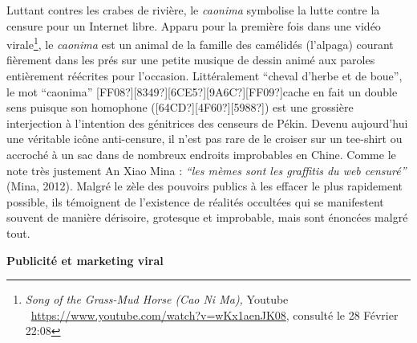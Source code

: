 Luttant contres les crabes de rivi\`ere, le \textit{caonima }symbolise
la lutte contre la censure pour un Internet libre. Apparu pour la
premi\`ere fois dans une vid\'eo virale\footnote{ \textit{Song of the
Grass-Mud Horse (Cao Ni Ma), }Youtube
\ \url{https://www.youtube.com/watch?v=wKx1aenJK08}, consult\'e le 28
F\'evrier 22:08\par }, le \textit{caonima} est un animal de la famille
des cam\'elid\'es (l{\textquoteright}alpaga) courant fi\`erement dans
les pr\'es sur une petite musique de dessin anim\'e aux paroles
enti\`erement r\'e\'ecrites pour l{\textquoteright}occasion.
Litt\'eralement {\textquotedblleft}cheval d{\textquoteright}herbe et de
boue{\textquotedblright}, le mot
{\textquotedblleft}caonima{\textquotedblright}
[FF08?][8349?][6CE5?][9A6C?][FF09?]cache en fait un double sens puisque
son homophone ([64CD?][4F60?][5988?]) est une grossi\`ere interjection
\`a l{\textquoteright}intention des g\'enitrices des censeurs de
P\'ekin. Devenu aujourd{\textquoteright}hui une v\'eritable ic\^one
anti-censure, il n{\textquoteright}est pas rare de le croiser sur un
tee-shirt ou accroch\'e \`a un sac dans de nombreux endroits
improbables en Chine. Comme le note tr\`es justement An Xiao Mina :
\textit{{\textquotedblleft}les m\`emes sont les graffitis du web
censur\'e{\textquotedblright}} (Mina, 2012). Malgr\'e le z\`ele des
pouvoirs publics \`a les effacer le plus rapidement possible, ils
t\'emoignent de l{\textquoteright}existence de r\'ealit\'es occult\'ees
qui se manifestent souvent de mani\`ere d\'erisoire, grotesque et
improbable, mais sont \'enonc\'ees malgr\'e tout.


\textbf{\textcolor[rgb]{0.0,0.0,0.039215688}{Publicit\'e et marketing
viral}}

